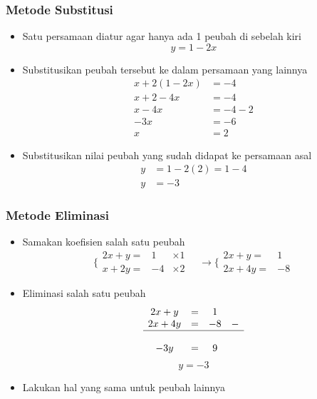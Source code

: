 \documentclass{beamer}
\begin{document}
\begin{frame}
\frametitle{Metode Substitusi}
\begin{itemize}
\item Satu persamaan diatur agar hanya ada 1 peubah di sebelah kiri
\begin{equation}
y= 1-2x
\nonumber
\end{equation}
\item Substitusikan peubah tersebut ke dalam persamaan yang lainnya
\begin{equation}
\begin{split}
x+ 2(1-2x)&=-4
\\x+2-4x&=-4
\\x-4x&=-4-2
\\-3x&=-6
\\x&=2
\end{split}
\nonumber
\end{equation}
\item Substitusikan nilai peubah yang sudah didapat ke persamaan asal
\begin{equation}
\begin{split}
y&= 1-2(2) = 1-4 
\\y&=-3
\end{split}
\nonumber
\end{equation}
\end{itemize}
\end{frame}


\begin{frame}
\frametitle{Metode Eliminasi}

\begin{itemize}
\item Samakan koefisien salah satu peubah
\begin{equation}
\Biggl\{ \begin{matrix}2x+y=&1 &\times 1\\x+2y=&-4& \times 2\end{matrix} \quad \rightarrow 
\Biggl\{ \begin{matrix}2x+y=&1 \\2x+4y=&-8\end{matrix}
\nonumber
\end{equation}
\item Eliminasi salah satu peubah
\begin{equation}
\begin{matrix}2x+y&=&1 \\2x+4y&=&-8 & -\\\hline \\-3y &=& 9\end{matrix}
\nonumber
\end{equation}
\begin{equation}
\boxed{y=-3}
\nonumber
\end{equation}
\item Lakukan hal yang sama untuk peubah lainnya
\end{itemize}
\end{frame}
\end{document}

